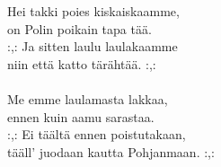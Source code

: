 
            Hei takki poies kiskaiskaamme, \\
            on Polin poikain tapa tää. \\
            :,: Ja sitten laulu laulakaamme \\
            niin että katto tärähtää. :,: \\
\hspace{10mm} \\
            Me emme laulamasta lakkaa, \\
            ennen kuin aamu sarastaa. \\
            :,: Ei täältä ennen poistutakaan, \\
            tääll' juodaan kautta Pohjanmaan. :,: \\
